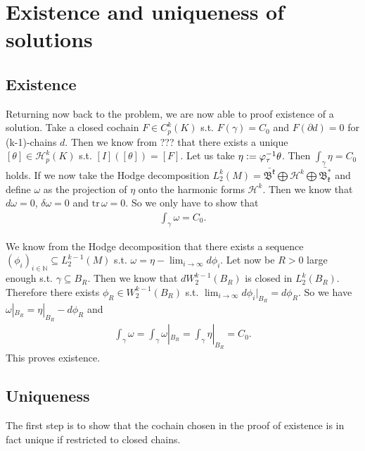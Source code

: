 \documentclass[12pt,a4paper]{article}
\begin{document}
\section{Existence and uniqueness of solutions}
\subsection{Existence}

Returning now back to the problem, we are now able to proof existence of a 
solution. Take a closed cochain $F \in C^k_p(K)$ s.t. $F(\gamma) = C_0$ and 
$F(\partial d) = 0$ for (k-1)-chains $d$. Then we know from ??? that 
there exists a unique $[\theta] \in \mathscr{H}_p^k(K)$ s.t. 
$[I]([\theta]) = [F]$. Let us take $\eta \vcentcolon= 
\varphi_\tau^{-1} \theta$. Then $\int_\gamma \eta = C_0$ holds. If we now take
the Hodge decomposition
$L^k_2(M) = \bar{\mathfrak{B^k}} \bigoplus \mathcal{H}^k \bigoplus
\bar{\mathfrak{B^*_k}}$ and define $\omega$ as the projection of $\eta$ onto the
harmonic forms $\mathcal{H}^k$. Then we know that $d\omega = 0$, 
$\delta\omega = 0$ and $\text{tr}\,\omega = 0$. So we only have to show that
\begin{align*}
\int_\gamma \omega = C_0.
\end{align*}

We know from the Hodge decomposition that there exists a sequence
$(\phi_i)_{i\in \mathbb{N}} \subseteq L^{k-1}_2(M)$ s.t. 
$\omega = \eta - \lim_{i \rightarrow \infty} d\phi_i$.
Let now be $R>0$ large enough s.t. $\gamma \subseteq B_R$. Then we know that
$d W^{k-1}_2(B_R)$ is closed in $L_2^k(B_R)$. Therefore there exists 
$\phi_R \in  W^{k-1}_2(B_R)$ s.t. 
$\lim_{i \rightarrow \infty} d\phi_i|_{B_R} = d\phi_R$. So we have
$\omega|_{B_R} = \eta|_{B_R} - d\phi_R$ and 
\begin{align*}
\int_\gamma \omega = \int_\gamma \omega|_{B_R} = \int_\gamma \eta|_{B_R} = C_0.
\end{align*}
This proves existence.

\subsection{Uniqueness}

The first step is to show that the cochain chosen in the proof of existence
is in fact unique if restricted to closed chains.
\end{document}

